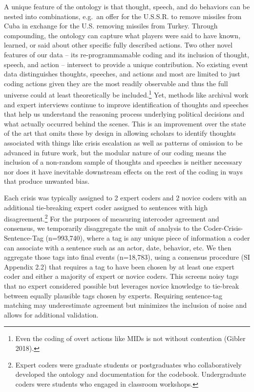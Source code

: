 \documentclass{article}
\begin{document}
A unique feature of the ontology is that thought, speech, and do
behaviors can be nested into combinations, e.g.~an offer for the
U.S.S.R. to remove missiles from Cuba in exchange for the U.S. removing
missiles from Turkey. Through compounding, the ontology can capture what
players were said to have known, learned, or said about other specific
fully described actions. Two other novel features of our data -- its
re-programmamable coding and its inclusion of thought, speech, and
action -- intersect to provide a unique contribution. No existing event
data distinguishes thoughts, speeches, and actions and most are limited
to just coding actions given they are the most readily observable and
thus the full universe could at least theoretically be
included.\footnote{Even the coding of overt actions like MIDs is not
  without contention (Gibler 2018).} Yet, methods like archival work and
expert interviews continue to improve identification of thoughts and
speeches that help us understand the reasoning process underlying
political decisions and what actually occurred behind the scenes. This
is an improvement over the state of the art that omits these by design
in allowing scholars to identify thoughts associated with things like
crisis escalation as well as patterns of omission to be advanced in
future work, but the modular nature of our coding means the inclusion of
a non-random sample of thoughts and speeches is neither necessary nor
does it have inevitable downstream effects on the rest of the coding in
ways that produce unwanted bias.

Each crisis was typically assigned to 2 expert coders and 2 novice
coders with an additional tie-breaking expert coder assigned to
sentences with high disagreement.\footnote{Expert coders were graduate
  students or postgraduates who collaboratively developed the ontology
  and documentation for the codebook. Undergraduate coders were students
  who engaged in classroom workshops.} For the purposes of measuring
intercoder agreement and consensus, we temporarily disaggregate the unit
of analysis to the Coder-Crisis-Sentence-Tag (n=993,740), where a tag is
any unique piece of information a coder can associate with a sentence
such as an actor, date, behavior, etc. We then aggregate those tags into
final events (n=18,783), using a consensus procedure (SI Appendix 2.2)
that requires a tag to have been chosen by at least one expert coder and
either a majority of expert or novice coders. This screens noisy tags
that no expert considered possible but leverages novice knowledge to
tie-break between equally plausible tags chosen by experts. Requiring
sentence-tag matching may underestimate agreement but minimizes the
inclusion of noise and allows for additional validation.
\end{document}
